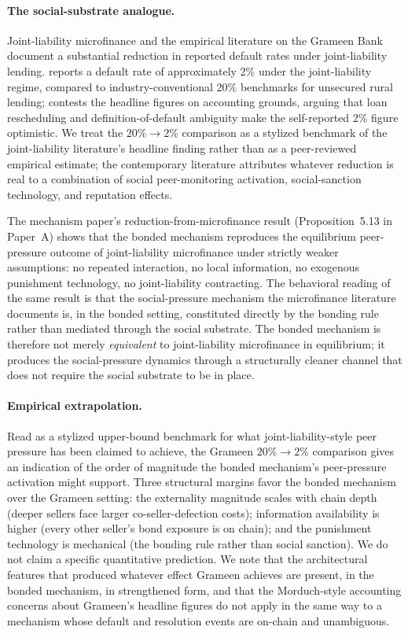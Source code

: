 \documentclass[11pt,a4paper]{article}
\theoremstyle{definition}
\theoremstyle{remark}
\begin{document}
\paragraph{The social-substrate analogue.}
Joint-liability microfinance \citep{ghatak1999, stiglitz1990}
and the empirical literature on the Grameen Bank document a
substantial reduction in reported default rates under
joint-liability lending. \citet{grameen1999} reports a default
rate of approximately 2\% under the joint-liability regime,
compared to industry-conventional 20\% benchmarks for
unsecured rural lending; \citet{morduch_1999} contests the
headline figures on accounting grounds, arguing that loan
rescheduling and definition-of-default ambiguity make the
self-reported 2\% figure optimistic. We treat the
$20\% \to 2\%$ comparison as a stylized benchmark of the
joint-liability literature's headline finding rather than as a
peer-reviewed empirical estimate; the contemporary literature
attributes whatever reduction is real to a combination of
social peer-monitoring activation, social-sanction technology,
and reputation effects.

The mechanism paper's reduction-from-microfinance result
(Proposition~5.13 in Paper~A) shows that the bonded mechanism
reproduces the equilibrium peer-pressure outcome of joint-liability
microfinance under strictly weaker assumptions: no repeated
interaction, no local information, no exogenous punishment
technology, no joint-liability contracting. The behavioral reading
of the same result is that the social-pressure mechanism the
microfinance literature documents is, in the bonded setting,
constituted directly by the bonding rule rather than mediated
through the social substrate. The bonded mechanism is therefore not
merely \emph{equivalent} to joint-liability microfinance in
equilibrium; it produces the social-pressure dynamics through a
structurally cleaner channel that does not require the social
substrate to be in place.

\paragraph{Empirical extrapolation.}
Read as a stylized upper-bound benchmark for what
joint-liability-style peer pressure has been claimed to achieve,
the Grameen $20\% \to 2\%$ comparison gives an indication of the
order of magnitude the bonded mechanism's peer-pressure
activation might support. Three structural margins favor the
bonded mechanism over the Grameen setting: the externality
magnitude scales with chain depth (deeper sellers face larger
co-seller-defection costs); information availability is higher
(every other seller's bond exposure is on chain); and the
punishment technology is mechanical (the bonding rule rather
than social sanction). We do not claim a specific quantitative
prediction. We note that the architectural features that
produced whatever effect Grameen achieves are present, in the
bonded mechanism, in strengthened form, and that the
Morduch-style accounting concerns about Grameen's headline
figures do not apply in the same way to a mechanism whose
default and resolution events are on-chain and unambiguous.
\end{document}
